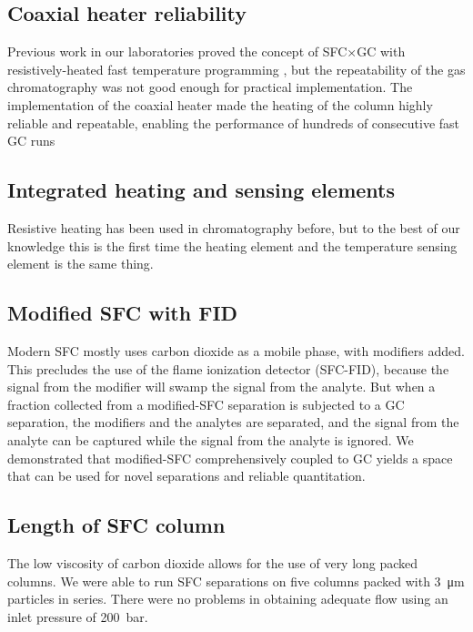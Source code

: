 \subsection{Coaxial heater reliability}

Previous work in our laboratories proved the concept of SFC×GC with
resistively-heated fast temperature programming \autocite{Venter2004,
Venter2006}, but the repeatability of the gas chromatography was not good enough
for practical implementation. The implementation of the coaxial heater made the
heating of the column highly reliable and repeatable, enabling the performance
of hundreds of consecutive fast GC runs

\subsection{Integrated heating and sensing elements}

Resistive heating has been used in chromatography before, but to the best of our
knowledge this is the first time the heating element and the temperature sensing
element is the same thing.

\subsection{Modified SFC with FID}

Modern SFC mostly uses carbon dioxide as a mobile phase, with modifiers added.
This precludes the use of the flame ionization detector (SFC-FID), because the
signal from the modifier will swamp the signal from the analyte. But when a
fraction collected from a modified-SFC separation is subjected to a GC
separation, the modifiers and the analytes are separated, and the signal
from the analyte can be captured while the signal from the analyte is ignored.
We demonstrated that modified-SFC comprehensively coupled to GC yields a space
that can be used for novel separations and reliable quantitation.

\subsection{Length of SFC column}

The low viscosity of carbon dioxide allows for the use of very long packed
columns. We were able to run SFC separations on five columns packed with
\SI{3}{\micro\metre} particles in series. There were no problems in obtaining
adequate flow using an inlet pressure of \SI{200}{\bar}.

